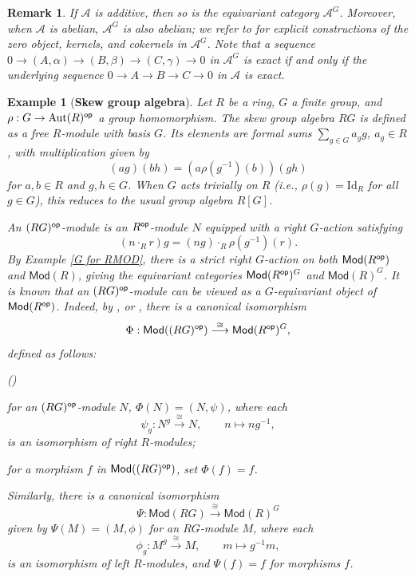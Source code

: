 \documentclass[12pt,twoside]{amsart}
\theoremstyle{bfupright head,slanted body}
\theoremstyle{bfupright head,upright body}
\theoremstyle{fixed bf head,slanted body}
\theoremstyle{fixed bf head,upright body}
\newtheorem{rmk}[res]{Remark}           \newtheorem*{rmk*}{Remark}
\newtheorem{exa}[res]{Example}           \newtheorem*{exa*}{Example}
\theoremstyle{numbered paragraph}
\newlength{\thmlistleft}        %
\newlength{\thmlistright}       %
\newlength{\thmlistpartopsep}   %
\newlength{\thmlisttopsep}      %
\newlength{\thmlistparsep}      %
\newlength{\thmlistitemsep}     %
\newcounter{rqm}
\newenvironment{rqm}{\begin{list}{\upshape (\arabic{rqm})}%
    {\usecounter{rqm}%
      \setlength{\leftmargin}{\thmlistleft}%
      \setlength{\labelwidth}{\thmlistleft}%
      \setlength{\rightmargin}{\thmlistright}%
      \setlength{\partopsep}{\thmlistpartopsep}%
      \setlength{\topsep}{\thmlisttopsep}%
      \setlength{\parsep}{\thmlistparsep}%
      \setlength{\itemsep}{\thmlistitemsep}}}%
  {\end{list}}%
\newcommand{\rmkcite}[2][?]{\cite[Remark~#1]{#2}}
\newcommand{\exacite}[2][?]{\cite[Example~#1]{#2}}
\numberwithin{equation}{res}
\newcommand{\calA}{\mathcal{A}}
\newcommand{\Mod}{\mathsf{Mod}}
\newcommand{\Id}{\mathrm{Id}}
\newcommand{\op}{\sf op}
\begin{document}
\begin{rmk} \label{equiv is abe}
If \(\calA\) is additive, then so is the equivariant category \(\calA^G\).
Moreover, when \(\calA\) is abelian, \(\calA^G\) is also abelian; we refer to \rmkcite[2.6]{2025Equ} for explicit constructions of the zero object, kernels, and cokernels in \(\calA^G\).
Note that a sequence \(0 \to (A,\alpha) \to (B,\beta) \to (C,\gamma) \to 0\) in \(\calA^G\) is exact if and only if the underlying sequence \(0 \to A \to B \to C \to 0\) in \(\calA\) is exact.
\end{rmk}

\begin{exa}[\bf Skew group algebra]\label{exa skew}
Let \(R\) be a ring, \(G\) a finite group, and \(\rho: G \to \operatorname{Aut}(R)^{\op}\) a group homomorphism.
The \emph{skew group algebra} \(RG\) is defined as a free \(R\)-module with basis \(G\).
Its elements are formal sums \(\sum_{g\in G} a_g g\), \(a_g\in R\), with multiplication given by
\[
(a g)(b h) = (a\rho(g^{-1})(b))(gh)
\]
for \(a,b\in R\) and \(g,h\in G\).
When \(G\) acts trivially on \(R\) (i.e., \(\rho(g)=\Id_R\) for all \(g\in G\)), this reduces to the usual group algebra \(R[G]\).

An \((RG)^{\op}\)-module is an \(R^{\op}\)-module \(N\)  equipped with a right \(G\)-action satisfying
\[
(n\cdot_R r)g = (n g)\cdot_R \rho(g^{-1})(r).
\]
By Example \ref{G for RMOD}, there is a strict right \(G\)-action on both \(\Mod(R^{\op})\) and \(\Mod(R)\), giving the equivariant categories \(\Mod(R^{\op})^G\) and \(\Mod(R)^G\).
It is known that an \((RG)^{\op}\)-module can be viewed as a \(G\)-equivariant object of \(\Mod(R^{\op})\).
Indeed, by \exacite[2.12]{2019Sun}, \cite[Example 2.6]{2017Chen} or \cite[Subsection 2.3]{2025Equ}, there is a canonical isomorphism
\[
\Phi:\Mod((RG)^{\op}) \overset{\cong}{\longrightarrow} \Mod(R^{\op})^G,
\]
defined as follows:
\begin{rqm}
\item[\(\bullet\)] for an \((RG)^{\op}\)-module \(N\), \(\Phi(N)=(N,\psi)\), where each
\[
\psi_g:N^g \overset{\cong}{\longrightarrow} N,\qquad n\mapsto n g^{-1},
\]
is an isomorphism of right \(R\)-modules;
\item[\(\bullet\)] for a morphism \(f\) in \(\Mod((RG)^{\op})\), set \(\Phi(f)=f\).
\end{rqm}

Similarly, there is a canonical isomorphism
\[
\Psi:\Mod(RG) \overset{\cong}{\longrightarrow} \Mod(R)^G
\]
given by \(\Psi(M)=(M,\phi)\) for an \(RG\)-module \(M\), where each
\[
\phi_g:M^g \overset{\cong}{\longrightarrow} M,\qquad m\mapsto g^{-1}m,
\]
is an isomorphism of left \(R\)-modules, and \(\Psi(f)=f\) for morphisms \(f\).
\end{exa}
\end{document}

